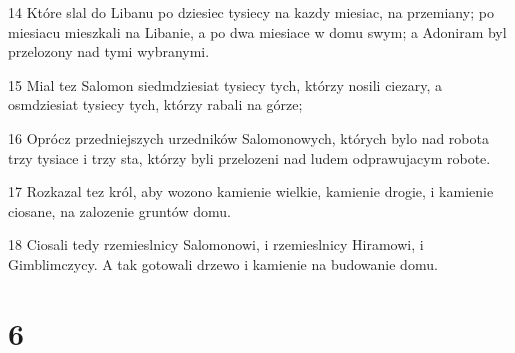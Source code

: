 \par 14 Które slal do Libanu po dziesiec tysiecy na kazdy miesiac, na przemiany; po miesiacu mieszkali na Libanie, a po dwa miesiace w domu swym; a Adoniram byl przelozony nad tymi wybranymi.
\par 15 Mial tez Salomon siedmdziesiat tysiecy tych, którzy nosili ciezary, a osmdziesiat tysiecy tych, którzy rabali na górze;
\par 16 Oprócz przedniejszych urzedników Salomonowych, których bylo nad robota trzy tysiace i trzy sta, którzy byli przelozeni nad ludem odprawujacym robote.
\par 17 Rozkazal tez król, aby wozono kamienie wielkie, kamienie drogie, i kamienie ciosane, na zalozenie gruntów domu.
\par 18 Ciosali tedy rzemieslnicy Salomonowi, i rzemieslnicy Hiramowi, i Gimblimczycy. A tak gotowali drzewo i kamienie na budowanie domu.

\chapter{6}

